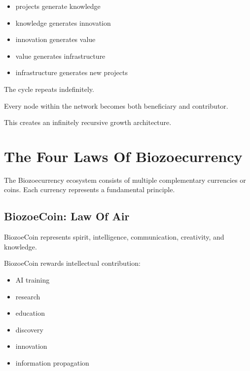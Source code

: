 ﻿\documentclass[12pt]{article}
\begin{document}
\begin{itemize}
  \item projects generate knowledge
\end{itemize}
\begin{itemize}
  \item knowledge generates innovation
\end{itemize}
\begin{itemize}
  \item innovation generates value
\end{itemize}
\begin{itemize}
  \item value generates infrastructure
\end{itemize}
\begin{itemize}
  \item infrastructure generates new projects
\end{itemize}

The cycle repeats indefinitely.

Every node within the network becomes both beneficiary and contributor.

This creates an infinitely recursive growth architecture.

\section{The Four Laws Of Biozoecurrency}


The Biozoecurrency ecosystem consists of multiple complementary currencies or coins. Each currency represents a fundamental principle.

\subsection{BiozoeCoin: Law Of Air}


BiozoeCoin represents spirit, intelligence, communication, creativity, and knowledge.

BiozoeCoin rewards intellectual contribution:

\begin{itemize}
  \item AI training
\end{itemize}
\begin{itemize}
  \item research
\end{itemize}
\begin{itemize}
  \item education
\end{itemize}
\begin{itemize}
  \item discovery
\end{itemize}
\begin{itemize}
  \item innovation
\end{itemize}
\begin{itemize}
  \item information propagation
\end{itemize}
\end{document}
